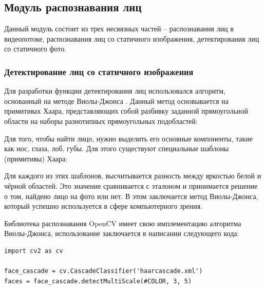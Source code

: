 \subsection{Модуль распознавания лиц}

Данный модуль состоит из трех несвязных частей -- распознавания лиц
в видеопотоке, распознавания лиц со статичного изображения, детектирования лиц
со статичного фото.

\subsubsection{Детектирование лиц со статичного изображения}

Для разработки функции детектирования лиц использовался алгоритм, основанный на
методе Виолы-Джонса \cite{recognition}. Данный метод основывается на примитивах Хаара,
представляющих собой разбивку заданной прямоугольной области на наборы
разнотипных прямоугольных подобластей:


Для того, чтобы найти лицо, нужно выделить его основные компоненты, такие как
нос, глаза, лоб, губы. Для этого существуют специальные шаблоны (примитивы)
Хаара:


Для каждого из этих шаблонов, высчитывается разность между яркостью белой
и чёрной областей. Это значение сравнивается с эталоном и принимается решение
о том, найдено лицо на фото или нет. В этом заключается метод Виолы-Джонса,
который успешно используется в сфере компьютерного зрения.


Библиотека распознавания OpenCV имеет свою имплементацию алгоритма
Виолы-Джонса, использование заключается в написании следующего кода:

\lstset{language=Python, basicstyle=\normalsize, keepspaces=true, numbers=left, breaklines=true,
frame=single, showstringspaces=true, columns=fullflexible} 
\begin{lstlisting}
import cv2 as cv

face_cascade = cv.CascadeClassifier('haarcascade.xml')
faces = face_cascade.detectMultiScale(#COLOR, 3, 5)
\end{lstlisting}


